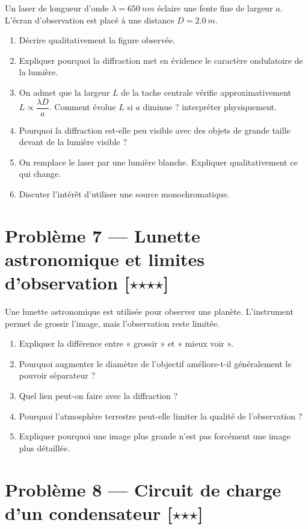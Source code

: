 \documentclass[11pt,a4paper]{article}
\newcommand{\etoile}{\ensuremath{\star}}
\begin{document}
Un laser de longueur d'onde $\lambda = \SI{650}{nm}$ éclaire une fente fine de largeur $a$. L'écran d'observation est placé à une distance $D=\SI{2,0}{m}$.

\begin{enumerate}[label=\arabic*)]
    \item Décrire qualitativement la figure observée.
    \item Expliquer pourquoi la diffraction met en évidence le caractère ondulatoire de la lumière.
    \item On admet que la largeur $L$ de la tache centrale vérifie approximativement $L \propto \dfrac{\lambda D}{a}$. Comment évolue $L$ si $a$ diminue ? interpréter physiquement.
    \item Pourquoi la diffraction est-elle peu visible avec des objets de grande taille devant de la lumière visible ?
    \item On remplace le laser par une lumière blanche. Expliquer qualitativement ce qui change.
    \item Discuter l'intérêt d'utiliser une source monochromatique.
\end{enumerate}

\section*{Problème 7 --- Lunette astronomique et limites d'observation \hfill [\etoile\etoile\etoile\etoile]}

Une lunette astronomique est utilisée pour observer une planète. L'instrument permet de grossir l'image, mais l'observation reste limitée.

\begin{enumerate}[label=\arabic*)]
    \item Expliquer la différence entre « grossir » et « mieux voir ». 
    \item Pourquoi augmenter le diamètre de l'objectif améliore-t-il généralement le pouvoir séparateur ?
    \item Quel lien peut-on faire avec la diffraction ?
    \item Pourquoi l'atmosphère terrestre peut-elle limiter la qualité de l'observation ?
    \item Expliquer pourquoi une image plus grande n'est pas forcément une image plus détaillée.
\end{enumerate}

\section*{Problème 8 --- Circuit de charge d'un condensateur \hfill [\etoile\etoile\etoile]}
\end{document}
